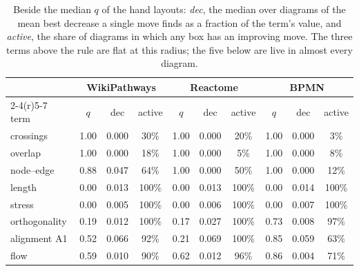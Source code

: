 \documentclass[11pt]{article}
\begin{document}
\begin{table}[!htbp]\centering\small
\begin{tabular}{@{}lccc@{\hspace{14pt}}ccc@{\hspace{14pt}}ccc@{}}
\toprule
& \multicolumn{3}{c}{WikiPathways} & \multicolumn{3}{c}{Reactome} & \multicolumn{3}{c}{BPMN} \\
\cmidrule(r){2-4}\cmidrule(r){5-7}\cmidrule{8-10}
term & $q$ & dec & active & $q$ & dec & active & $q$ & dec & active \\
\midrule
crossings      & 1.00 & 0.000 & 30\% & 1.00 & 0.000 & 20\% & 1.00 & 0.000 & 3\% \\
overlap        & 1.00 & 0.000 & 18\% & 1.00 & 0.000 & 5\%  & 1.00 & 0.000 & 8\% \\
node--edge     & 0.88 & 0.047 & 64\% & 1.00 & 0.000 & 50\% & 1.00 & 0.000 & 12\% \\
\midrule
length         & 0.00 & 0.013 & 100\% & 0.00 & 0.013 & 100\% & 0.00 & 0.014 & 100\% \\
stress         & 0.00 & 0.005 & 100\% & 0.00 & 0.006 & 100\% & 0.00 & 0.007 & 100\% \\
orthogonality  & 0.19 & 0.012 & 100\% & 0.17 & 0.027 & 100\% & 0.73 & 0.008 & 97\% \\
alignment A1   & 0.52 & 0.066 & 92\%  & 0.21 & 0.069 & 100\% & 0.85 & 0.059 & 63\% \\
flow           & 0.59 & 0.010 & 90\%  & 0.62 & 0.012 & 96\%  & 0.86 & 0.004 & 71\% \\
\bottomrule
\end{tabular}
\caption{Beside the median $q$ of the hand layouts: \emph{dec}, the median over diagrams
of the mean best decrease a single move finds as a fraction of the term's value, and
\emph{active}, the share of diagrams in which any box has an improving move. The three
terms above the rule are flat at this radius; the five below are live in almost every
diagram.}
\label{tab:dec}
\end{table}
\end{document}
